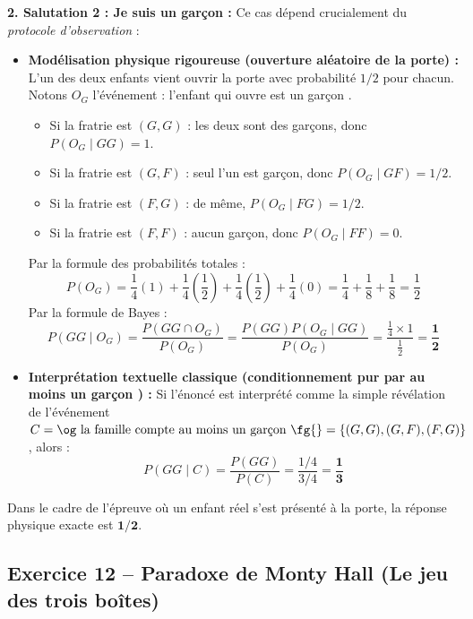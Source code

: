 \documentclass[11pt,a4paper]{article}
\begin{document}
\begin{correctionbox}
\textbf{2. Salutation 2 : \og Je suis un garçon \fg{} :}
Ce cas dépend crucialement du \emph{protocole d'observation} :
\begin{itemize}[label=$\bullet$]
    \item \textbf{Modélisation physique rigoureuse (ouverture aléatoire de la porte) :}
    L'un des deux enfants vient ouvrir la porte avec probabilité $1/2$ pour chacun.
    Notons $O_G$ l'événement : \og l'enfant qui ouvre est un garçon \fg{}.
    \begin{itemize}
        \item Si la fratrie est $(G, G)$ : les deux sont des garçons, donc $P(O_G \mid GG) = 1$.
        \item Si la fratrie est $(G, F)$ : seul l'un est garçon, donc $P(O_G \mid GF) = 1/2$.
        \item Si la fratrie est $(F, G)$ : de même, $P(O_G \mid FG) = 1/2$.
        \item Si la fratrie est $(F, F)$ : aucun garçon, donc $P(O_G \mid FF) = 0$.
    \end{itemize}
    Par la formule des probabilités totales :
    \[
    P(O_G) = \frac{1}{4}(1) + \frac{1}{4}\left(\frac{1}{2}\right) + \frac{1}{4}\left(\frac{1}{2}\right) + \frac{1}{4}(0) = \frac{1}{4} + \frac{1}{8} + \frac{1}{8} = \frac{1}{2}
    \]
    Par la formule de Bayes :
    \[
    P(GG \mid O_G) = \frac{P(GG \cap O_G)}{P(O_G)} = \frac{P(GG) P(O_G \mid GG)}{P(O_G)} = \frac{\frac{1}{4} \times 1}{\frac{1}{2}} = \mathbf{\frac{1}{2}}
    \]
    \item \textbf{Interprétation textuelle classique (conditionnement pur par \og au moins un garçon \fg{}) :}
    Si l'énoncé est interprété comme la simple révélation de l'événement $C = \text{\og la famille compte au moins un garçon \fg{}} = \{(G, G), (G, F), (F, G)\}$, alors :
    \[
    P(GG \mid C) = \frac{P(GG)}{P(C)} = \frac{1/4}{3/4} = \mathbf{\frac{1}{3}}
    \]
\end{itemize}
Dans le cadre de l'épreuve où un enfant réel s'est présenté à la porte, la réponse physique exacte est $\mathbf{1/2}$.
\end{correctionbox}

\vspace{0.3cm}

\subsection*{Exercice 12 -- Paradoxe de Monty Hall (Le jeu des trois boîtes)}
\end{document}
